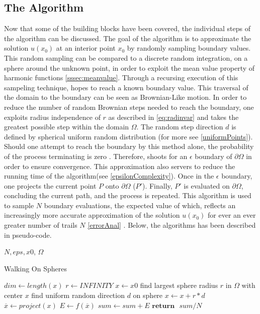 \subsection{The Algorithm}\label{sssec:algorithm} %
Now that some of the building blocks have been covered, the individual steps of
the algorithm can be discussed.  The goal of the algorithm is to approximate
the solution $u(x_{0})$ at an interior point $x_{0}$ by randomly sampling boundary
values.  This random sampling can be compared to a discrete random integration,
on a sphere around the unknown point, in order to exploit the mean value property
of harmonic functions \ref{sssec:meanvalue}.  Through a recursing execution of this sampeling
technique, hopes to reach a known boundary value.   This traversal of
 the domain to the boundary can be seen as  Brownian-Like motion.
In order to reduce the number of random Brownian steps needed to reach the boundary,
one exploits radius independence of $r$ as described in \ref{eq:radinvar} and takes
the greatest possible step within the domain $\Omega$.  The random step direction $d$
is defined by spherical uniform random distribution (for more see \ref{uniformPoints}).
Should one attempt to reach the boundary by this method alone, the probability of the
process terminating is zero \cite{kakutani1944, DeLaurentis, Bornemann}.  Therefore, shoots for an
$\epsilon$ boundary of $\partial \Omega$ in order to ensure convergence. This approximation also
servers to reduce the running time of the algorithm(see \ref{epsilonComplexity}). Once in the $\epsilon$
boundary, one projects the current point $P$ onto $\partial \Omega$ ($P'$).  Finally,
$P'$ is evaluated on $\partial \Omega$, concluding the current path, and the process
is repeated.
This algorithm is used to sample $N$ boundary evaluations, the expected value of which,
reflects an increasingly more accurate approximation of the solution $u(x_{0})$
for ever an ever greater number of trails $N$ \ref{errorAnal} \cite{Bornemann,DeLaurentis}.  Below, the algorithms has been
described in pseudo-code.
 \begin{algorithm}[H]{$N, eps, x0$, $\Omega$}
  \caption{Walking On Spheres}
 \label{alg:wos}
\begin{algorithmic}[1]
   \State $dim \gets length(x)$ 
   \State $ r \gets INFINITY$
   \label{lst:line:for}
   \State $x \leftarrow x0$
      \State find largest sphere radius $r$ in $\Omega$ with center $x$ \label{lst:line:radius}
      \State find uniform random direction $d$ on sphere \label{lst:line:direction}
      \State $ x \gets x + r * d$ 
 \EndWhile
 \State $\overline x \gets project(x)$ 
 \State $E \gets f(\overline x)$ 
 \State $sum \gets sum + E$  \label{lst:line:reduce}
  \EndFor
 \State $\textbf{return} \text{ } sum / N$ 

\end{algorithmic}
\end{algorithm}

